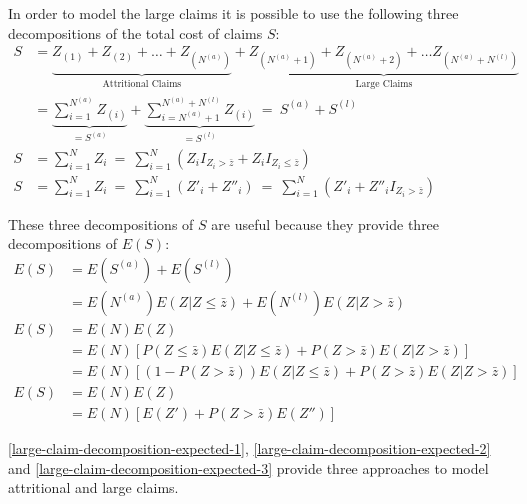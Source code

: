 \documentclass[a4paper, nobind]{templates/ociamthesis}
\theoremstyle{definition}
\theoremstyle{definition}
\theoremstyle{definition}
\theoremstyle{remark}
\begin{document}
In order to model the large claims it is possible to use the following three decompositions of the total cost of claims \(S\):
\begin{align}
  \nonumber
  S & = \underbrace{Z_{(1)} + Z_{(2)} + \dots + Z_{(N^{(a)})}}_{\text{Attritional Claims}} +
        \underbrace{Z_{(N^{(a)} + 1)} + Z_{(N^{(a)} + 2)} + \dots Z_{(N^{(a)} + N^{(l)})}}_{\text{Large Claims}} \\
  \label{large-claim-decomposition-1}
    & = \underbrace{\sum_{i=1}^{N^{(a)}}{Z_{(i)}}}_{=S^{(a)}} +
            \underbrace{\sum_{i = N^{(a)} + 1}^{N^{(a)} + N^{(l)}}{Z_{(i)}}}_{=S^{(l)}}
    \ = \ S^{(a)} + S^{(l)} \\[12pt]
  \label{large-claim-decomposition-2}
  S & = \sum_{i=1}^{N}{Z_i}
    \ = \ \sum_{i=1}^{N}{\left(
      Z_i I_{Z_i>\bar{z}} +
      Z_i I_{Z_i\le\bar{z}}
      \right)} \\[12pt]
  \label{large-claim-decomposition-3}
  S & = \sum_{i=1}^{N}{Z_i}
    \ = \ \sum_{i=1}^{N}{\left(Z'_i + Z''_i\right)}
    \ = \ \sum_{i=1}^{N}{\left(Z'_i + Z''_i I_{Z_i > \bar{z}}\right)}
\end{align}

These three decompositions of \(S\) are useful because they provide three decompositions of \(E(S)\):
\begin{align}
  \nonumber
  E(S) & = E(S^{(a)}) + E(S^{(l)}) \\
    \label{large-claim-decomposition-expected-1}
    & = E(N^{(a)}) E(Z|Z\le\bar{z}) + E(N^{(l)}) E(Z|Z>\bar{z}) \\[12pt]
  \nonumber
  E(S) & = E(N) E(Z) \\
    \nonumber
    & = E(N) \left[P(Z\le\bar{z}) E(Z|Z\le\bar{z}) + P(Z>\bar{z}) E(Z|Z > \bar{z}) \right] \\
    \label{large-claim-decomposition-expected-2}
    & = E(N) \left[\left( 1 - P(Z>\bar{z}) \right) E(Z|Z\le\bar{z}) + P(Z>\bar{z}) E(Z|Z > \bar{z})\right] \\[12pt]
  \nonumber
  E(S) & = E(N) E(Z) \\
    \label{large-claim-decomposition-expected-3}
    & = E(N) \left[E(Z') + P(Z>\bar{z}) E(Z'')\right]
\end{align}

\ref{large-claim-decomposition-expected-1}, \ref{large-claim-decomposition-expected-2} and \ref{large-claim-decomposition-expected-3} provide three approaches to model attritional and large claims.
\end{document}
